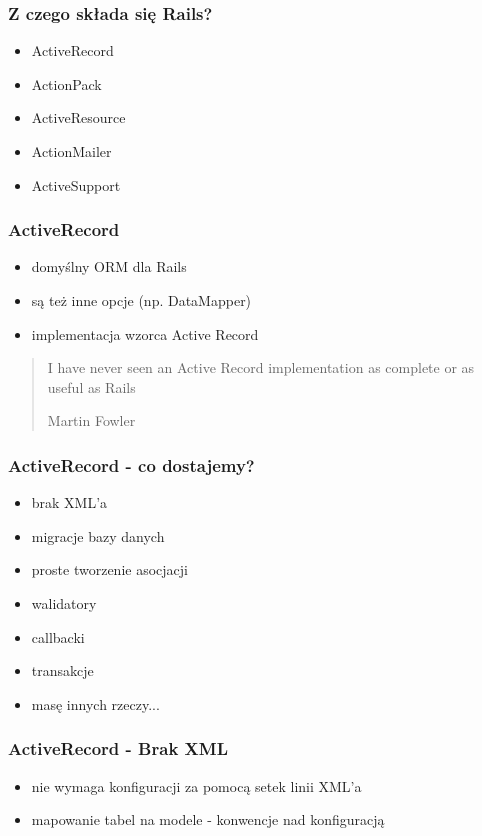 \documentclass[12t]{beamer}
\begin{document}
\begin{frame}
  \frametitle{Z czego składa się Rails?}
  \begin{itemize}
  \item ActiveRecord
  \item ActionPack
  \item ActiveResource
  \item ActionMailer
  \item ActiveSupport
  \end{itemize}
\end{frame}

\begin{frame}
  \frametitle{ActiveRecord}
  \begin{itemize}
  \item domyślny ORM dla Rails
  \item są też inne opcje (np. DataMapper)
  \item implementacja wzorca Active Record
  \end{itemize}
\end{frame}

\begin{frame}
  \begin{quote}
    I have never seen an Active Record implementation as complete or as useful as Rails

    \hfill Martin Fowler
  \end{quote}
\end{frame}

\begin{frame}
  \frametitle{ActiveRecord - co dostajemy?}
  \begin{itemize}
  \item brak XML'a
  \item migracje bazy danych
  \item proste tworzenie asocjacji
  \item walidatory
  \item callbacki
  \item transakcje
  \item masę innych rzeczy...
  \end{itemize}
\end{frame}

\begin{frame}
  \frametitle{ActiveRecord - Brak XML}
  \begin{itemize}
  \item nie wymaga konfiguracji za pomocą setek linii XML'a
  \item mapowanie tabel na modele - konwencje nad konfiguracją
  \end{itemize}
\end{frame}
\end{document}
